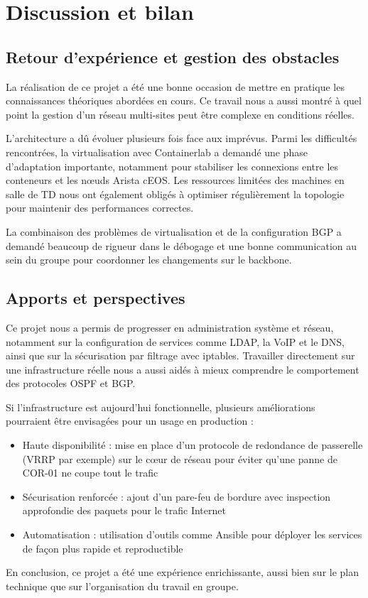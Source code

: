 \section{Discussion et bilan}

\subsection{Retour d'expérience et gestion des obstacles}
La réalisation de ce projet a été une bonne occasion de mettre en pratique les connaissances théoriques abordées en cours. Ce travail nous a aussi montré à quel point la gestion d'un réseau multi-sites peut être complexe en conditions réelles.

L'architecture a dû évoluer plusieurs fois face aux imprévus. Parmi les difficultés rencontrées, la virtualisation avec Containerlab a demandé une phase d'adaptation importante, notamment pour stabiliser les connexions entre les conteneurs et les nœuds Arista cEOS. Les ressources limitées des machines en salle de TD nous ont également obligés à optimiser régulièrement la topologie pour maintenir des performances correctes.

La combinaison des problèmes de virtualisation et de la configuration BGP a demandé beaucoup de rigueur dans le débogage et une bonne communication au sein du groupe pour coordonner les changements sur le backbone.

\subsection{Apports et perspectives}
Ce projet nous a permis de progresser en administration système et réseau, notamment sur la configuration de services comme LDAP, la VoIP et le DNS, ainsi que sur la sécurisation par filtrage avec iptables. Travailler directement sur une infrastructure réelle nous a aussi aidés à mieux comprendre le comportement des protocoles OSPF et BGP.

Si l'infrastructure est aujourd'hui fonctionnelle, plusieurs améliorations pourraient être envisagées pour un usage en production :
\begin{itemize}
    \item Haute disponibilité : mise en place d'un protocole de redondance de passerelle (VRRP par exemple) sur le cœur de réseau pour éviter qu'une panne de COR-01 ne coupe tout le trafic
    \item Sécurisation renforcée : ajout d'un pare-feu de bordure avec inspection approfondie des paquets pour le trafic Internet
    \item Automatisation : utilisation d'outils comme Ansible pour déployer les services de façon plus rapide et reproductible
\end{itemize}

En conclusion, ce projet a été une expérience enrichissante, aussi bien sur le plan technique que sur l'organisation du travail en groupe.
